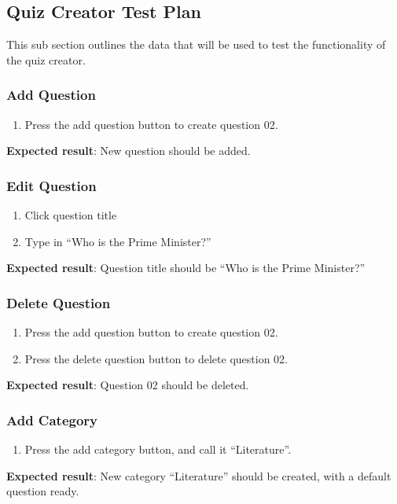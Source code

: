 \subsection{Quiz Creator Test Plan}
This sub section outlines the data that will be used to test the functionality of the quiz creator.

\subsubsection{Add Question}
\begin{enumerate}[leftmargin=*]
\item Press the add question button to create question 02.
\end{enumerate}

\textbf{Expected result}: New question should be added.

\subsubsection{Edit Question}
\begin{enumerate}[leftmargin=*]
\item Click question title
\item Type in ``Who is the Prime Minister?''
\end{enumerate}
\textbf{Expected result}: Question title should be ``Who is the Prime Minister?''

\subsubsection{Delete Question}
\begin{enumerate}[leftmargin=*]
\item Press the add question button to create question 02.
\item Press the delete question button to delete question 02.
\end{enumerate}
\textbf{Expected result}: Question 02 should be deleted.

\subsubsection{Add Category}
\begin{enumerate}[leftmargin=*]
\item Press the add category button, and call it ``Literature''.
\end{enumerate}
\textbf{Expected result}: New category ``Literature'' should be created, with a default question ready.

